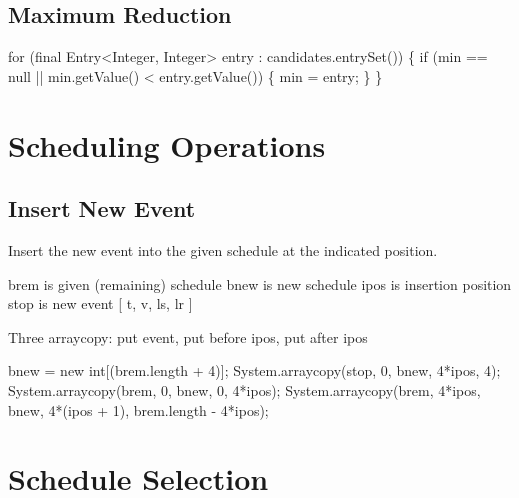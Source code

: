 \section{Maximum Reduction}

\nwenddocs{}\endmoddef\nwstartdeflinemarkup\nwenddeflinemarkup
for (final Entry<Integer, Integer> entry : candidates.entrySet()) \{
  if (min == null || min.getValue() < entry.getValue()) \{
    min = entry;
  \}
\}
\nwendcode{}\nwdocspar

\nwenddocs{}\chapter{Scheduling Operations}
\label{search-scheduling}

\section{Insert New Event}

Insert the new event into the given schedule at the indicated position.

brem is given (remaining) schedule
bnew is new schedule
ipos is insertion position
stop is new event [ t, v, ls, lr ]

Three arraycopy: put event, put before ipos, put after ipos

\nwenddocs{}\endmoddef\nwstartdeflinemarkup{}\nwenddeflinemarkup
bnew = new int[(brem.length + 4)];
System.arraycopy(stop, 0, bnew, 4*ipos, 4);
System.arraycopy(brem, 0, bnew, 0, 4*ipos);
System.arraycopy(brem, 4*ipos, bnew, 4*(ipos + 1), brem.length - 4*ipos);
\nwendcode{}\nwdocspar


\nwenddocs{}\chapter{Schedule Selection}
\label{search-schedules}

